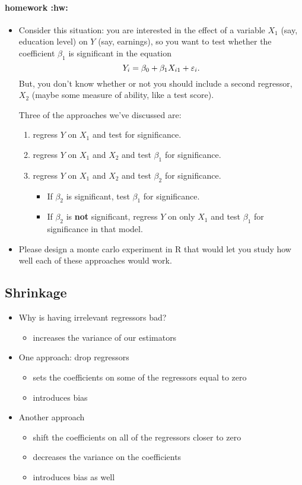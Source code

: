 \paragraph{homework \textbf{:hw:}}
\begin{itemize}
\item Consider this situation: you are interested in the effect of a
        variable $X_1$ (say, education level) on $Y$ (say, earnings),
        so you want to test whether the coefficient $\beta_1$ is
        significant in the equation
        \[ Y_{i} = \beta_0 + \beta_1 X_{i1} + \varepsilon_i. \]
        But, you don't know whether or not you should include a second
        regressor, $X_2$ (maybe some measure of ability, like a test
        score).

        Three of the approaches we've discussed are:
\begin{enumerate}
\item regress $Y$ on $X_1$ and test for significance.
\item regress $Y$ on $X_1$ and $X_2$ and test $\beta_1$ for
           significance.
\item regress $Y$ on $X_1$ and $X_2$ and test $\beta_2$ for
           significance.
\begin{itemize}
\item If $\beta_2$ is significant, test $\beta_1$ for
             significance.
\item If $\beta_2$ is \textbf{not} significant, regress $Y$ on only
             $X_1$ and test $\beta_1$ for significance in that
             model.
\end{itemize}
\end{enumerate}
\item Please design a monte carlo experiment in R that would let you
        study how well each of these approaches would work.
\end{itemize}

\subsection{Shrinkage}
\begin{itemize}
\item Why is having irrelevant regressors bad?
\begin{itemize}
\item increases the variance of our estimators
\end{itemize}
\item One approach: drop regressors
\begin{itemize}
\item sets the coefficients on some of the regressors equal to zero
\item introduces bias
\end{itemize}
\item Another approach
\begin{itemize}
\item shift the coefficients on all of the regressors closer to zero
\item decreases the variance on the coefficients
\item introduces bias as well
\end{itemize}
\end{itemize}

